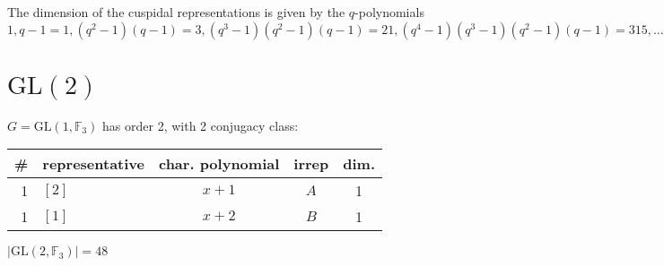 \documentclass[11pt,oneside]{article}
\newcommand{\GL}{\mathrm{GL}}
\newcommand{\Field}{\mathbb{F}}
\begin{document}
The dimension of the cuspidal representations is given by the $q$-polynomials
$
1, q-1=1, 
(q^2-1)(q-1)=3, 
(q^3-1)(q^2-1)(q-1)=21, 
(q^4-1)(q^3-1)(q^2-1)(q-1)=315, ...
$


\section{$\GL(2)$}

$G=\GL(1,\Field_3)$ has order 2, with 2 conjugacy class:
\begin{center}
\begin{tabular}{r|l|c|c|c}
\# & representative & char. polynomial & irrep & dim. \\
\hline
1 & $[2]$           & $x+1$            & $A$   & 1    \\
1 & $[1]$           & $x+2$            & $B$   & 1    \\
\end{tabular}
\end{center}

$|\GL(2,\Field_3)|=48$


\end{document}
